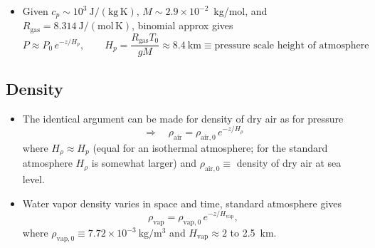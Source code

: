 \documentclass[11pt, oneside]{article}
\begin{document}
\begin{itemize}
	\item Given $c_p \sim 10^3~\mathrm{J/(kg\,K)}$, $M \sim 2.9\times10^{-2}$~kg/mol, and $R_\mathrm{gas} = 8.314~\mathrm{J/(mol\,K)}$, binomial approx gives
	\begin{equation}
		\label{e:Hp}
		\boxed{P \approx P_0\,e^{-z/H_p}, \qquad H_p = \frac{R_\mathrm{gas}T_0}{gM} \approx 8.4~\mathrm{km} \equiv \text{pressure scale height of atmosphere}}
	\end{equation}
\end{itemize}

\subsection{Density}
\label{s:dens}

\begin{itemize}
	\item The identical argument can be made for density of dry air as for pressure
	\begin{equation}
		\label{e:rho}
		\Rightarrow\quad \rho_\mathrm{air} = \rho_{\mathrm{air},0}\,e^{-z/H_\rho}
	\end{equation}
	where $H_\rho \approx H_p$ (equal for an isothermal atmosphere; for the standard atmosphere $H_\rho$ is somewhat larger) and $\rho_{\mathrm{air},0} \equiv$ density of dry air at sea level.
	\item Water vapor density varies in space and time, standard atmosphere gives
	\begin{equation}
		\label{e:rhov}
		\rho_\mathrm{vap} = \rho_{\mathrm{vap},0}\,e^{-z/H_\mathrm{vap}},
	\end{equation}
	where $\rho_{\mathrm{vap},0} \equiv 7.72\times10^{-3}~\mathrm{kg/m^3}$ and $H_\mathrm{vap} \approx 2$ to 2.5~km.
\end{itemize}
\end{document}
